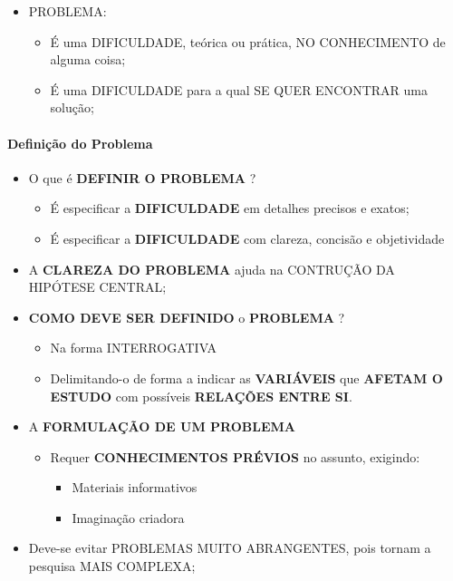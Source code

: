 \documentclass[
]{book}
\providecommand{\tightlist}{%
  \setlength{\itemsep}{0pt}\setlength{\parskip}{0pt}}
\begin{document}
\begin{itemize}
\tightlist
\item
  PROBLEMA:

  \begin{itemize}
  \tightlist
  \item
    É uma DIFICULDADE, teórica ou prática, NO CONHECIMENTO de alguma
    coisa;
  \item
    É uma DIFICULDADE para a qual SE QUER ENCONTRAR uma solução;
  \end{itemize}
\end{itemize}

\hypertarget{definiuxe7uxe3o-do-problema}{%
\paragraph{Definição do Problema}\label{definiuxe7uxe3o-do-problema}}

\begin{itemize}
\tightlist
\item
  O que é \textbf{DEFINIR O PROBLEMA} ?

  \begin{itemize}
  \tightlist
  \item
    É especificar a \textbf{DIFICULDADE} em detalhes precisos e exatos;
  \item
    É especificar a \textbf{DIFICULDADE} com clareza, concisão e
    objetividade
  \end{itemize}
\item
  A \textbf{CLAREZA DO PROBLEMA} ajuda na CONTRUÇÃO DA HIPÓTESE CENTRAL;
\item
  \textbf{COMO DEVE SER DEFINIDO} o \textbf{PROBLEMA} ?

  \begin{itemize}
  \tightlist
  \item
    Na forma INTERROGATIVA
  \item
    Delimitando-o de forma a indicar as \textbf{VARIÁVEIS} que
    \textbf{AFETAM O ESTUDO} com possíveis \textbf{RELAÇÕES ENTRE SI}.
  \end{itemize}
\item
  A \textbf{FORMULAÇÃO DE UM PROBLEMA}

  \begin{itemize}
  \tightlist
  \item
    Requer \textbf{CONHECIMENTOS PRÉVIOS} no assunto, exigindo:

    \begin{itemize}
    \tightlist
    \item
      Materiais informativos
    \item
      Imaginação criadora
    \end{itemize}
  \end{itemize}
\item
  Deve-se evitar PROBLEMAS MUITO ABRANGENTES, pois tornam a pesquisa
  MAIS COMPLEXA;
\end{itemize}
\end{document}
